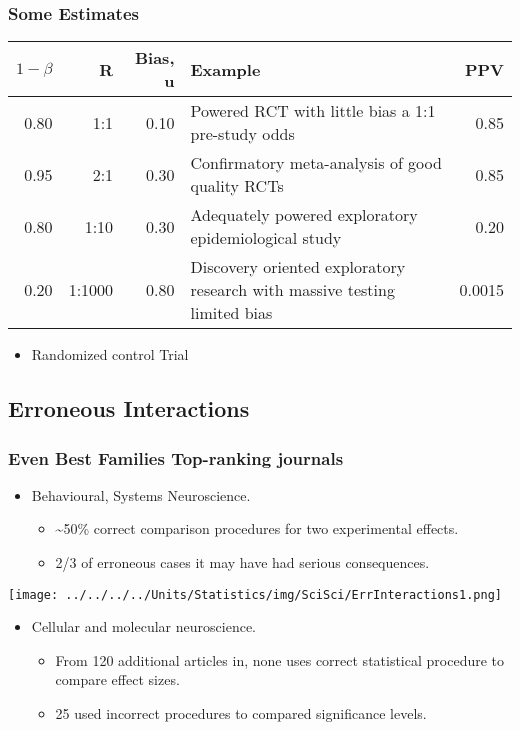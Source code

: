 \documentclass[10pt,article]{article}
\begin{document}
\subsubsection{Some Estimates}
\label{sec:orgf328532}
\begin{center}
\begin{tabular}{rrrlr}
\(1-\beta\) & R & Bias, u & Example & PPV\\
\hline
0.80 & 1:1 & 0.10 & Powered RCT with little bias a 1:1 pre-study odds & 0.85\\
0.95 & 2:1 & 0.30 & Confirmatory meta-analysis of good quality RCTs & 0.85\\
0.80 & 1:10 & 0.30 & Adequately powered exploratory epidemiological study & 0.20\\
0.20 & 1:1000 & 0.80 & Discovery oriented exploratory research with massive testing limited bias & 0.0015\\
\end{tabular}
\end{center}
\begin{itemize}
\item Randomized control Trial
\end{itemize}
\subsection{Erroneous Interactions}
\label{sec:orgffd53df}
\subsubsection{Even Best Families Top-ranking journals}
\label{sec:orgd9c1826}
\begin{itemize}
\item Behavioural, Systems Neuroscience.
\begin{itemize}
\item \textasciitilde{}50\% correct comparison procedures for two experimental effects.
\item 2/3 of erroneous cases it may have had serious consequences.
\end{itemize}
\end{itemize}
\begin{center}
\texttt{[image: ../../../../Units/Statistics/img/SciSci/ErrInteractions1.png]}
\end{center}
\begin{itemize}
\item Cellular and molecular neuroscience.
\begin{itemize}
\item From 120 additional articles in, none uses correct statistical procedure to compare effect sizes.
\item 25 used incorrect procedures to compared significance levels.
\end{itemize}
\end{itemize}
\end{document}
